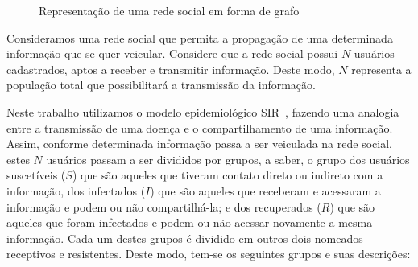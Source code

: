 \documentclass[
	12pt,				%
	openright,			%
	oneside,			%
	a4paper,			%
	english,			%
	french,				%
	spanish,			%
	brazil				%
	]{abntex2}
\begin{document}
\begin{center}
    \begin{figure}
      \begin{center}
        \setlength\fboxsep{0pt}
        \setlength\fboxrule{0pt}
        \caption{Representação de uma rede social em forma de grafo}
        \label{fig:grafo}
      \end{center}
    \end{figure}
\end{center}

Consideramos uma rede social que permita a propagação de uma
determinada informação que se quer veicular. Considere que a rede
social possui $N$ usuários cadastrados, aptos a receber e transmitir
informação. Deste modo, $N$ representa a população total que
possibilitará a transmissão da informação.

Neste trabalho utilizamos o modelo epidemiológico
SIR~\cite{hethcote2000}, fazendo uma analogia entre a transmissão de
uma doença e o compartilhamento de uma informação.  Assim, conforme
determinada informação passa a ser veiculada na rede social, estes $N$
usuários passam a ser divididos por grupos, a saber, o grupo dos
usuários suscetíveis ($S$) que são aqueles que tiveram contato direto
ou indireto com a informação, dos infectados ($I$) que são aqueles que
receberam e acessaram a informação e podem ou não compartilhá-la; e
dos recuperados ($R$) que são aqueles que foram infectados e podem ou
não acessar novamente a mesma informação. Cada um destes grupos é
dividido em outros dois nomeados receptivos e resistentes. Deste modo,
tem-se os seguintes grupos e suas descrições:
\end{document}

